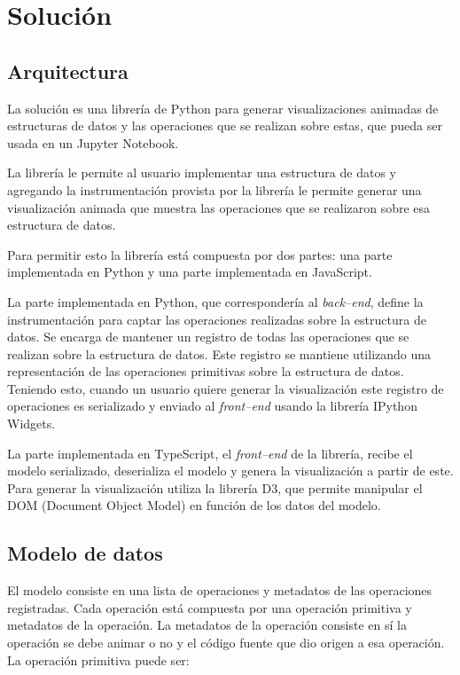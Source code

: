 \chapter{Solución}

\section{Arquitectura}

La solución es una librería de Python para generar visualizaciones animadas de estructuras de datos y las operaciones que se realizan sobre estas, que pueda ser usada en un Jupyter Notebook.

La librería le permite al usuario implementar una estructura de datos y agregando la instrumentación provista por la librería le permite generar una visualización animada que muestra las operaciones que se realizaron sobre esa estructura de datos.

Para permitir esto la librería está compuesta por dos partes: una parte implementada en Python y una parte implementada en JavaScript.

La parte implementada en Python, que correspondería al \textit{back--end}, define la instrumentación para captar las operaciones realizadas sobre la estructura de datos. Se encarga de mantener un registro de todas las operaciones que se realizan sobre la estructura de datos. Este registro se mantiene utilizando una representación de las operaciones primitivas sobre la estructura de datos. Teniendo esto, cuando un usuario quiere generar la visualización este registro de operaciones es serializado y enviado al \textit{front--end} usando la librería IPython Widgets.

La parte implementada en TypeScript, el \textit{front--end} de la librería, recibe el modelo serializado, deserializa el modelo y genera la visualización a partir de este. Para generar la visualización utiliza la librería D3, que permite manipular el DOM (Document Object Model) en función de los datos del modelo.

\section{Modelo de datos}

El modelo consiste en una lista de operaciones y metadatos de las operaciones registradas. Cada operación está compuesta por una operación primitiva y metadatos de la operación. La metadatos de la operación consiste en sí la operación se debe animar o no y el código fuente que dio origen a esa operación. La operación primitiva puede ser:

